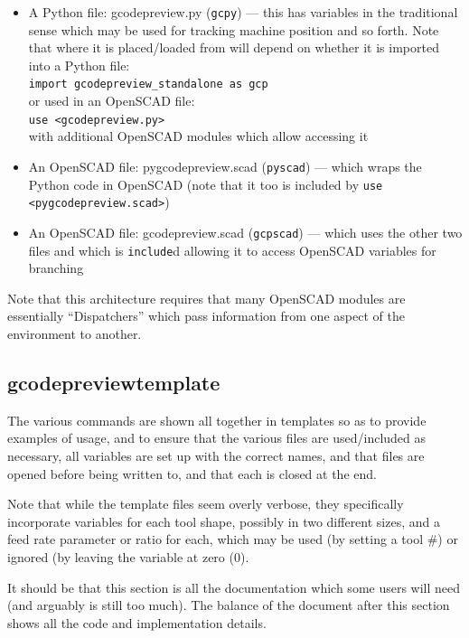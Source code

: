 \documentclass{ltxdoc}
\begin{document}
\begin{itemize}
\item A Python file: gcodepreview.py (\texttt{gcpy}) --- this has variables in the 
      traditional sense which may be used for tracking machine position and so forth. 
      Note that where it is placed/loaded from will depend on whether it is imported into
      a Python file:\\
      \verb|import gcodepreview_standalone as gcp|\\ 
      or used in an OpenSCAD file:\\
      \verb|use <gcodepreview.py>|\\
      with additional OpenSCAD modules which allow accessing it
\item An OpenSCAD file: pygcodepreview.scad (\texttt{pyscad}) --- which wraps the Python code 
      in OpenSCAD (note that it too is included by \verb|use <pygcodepreview.scad>|)
\item An OpenSCAD file: gcodepreview.scad (\texttt{gcpscad}) --- which uses the other two files 
      and which is \texttt{include}d allowing it to access OpenSCAD variables for branching   
\end{itemize}

\noindent Note that this architecture requires that many OpenSCAD modules are essentially 
``Dispatchers'' which pass information from one aspect of the environment to another.

\subsection{gcodepreviewtemplate}

The various commands are shown all together in templates so as to provide examples of usage, and to ensure that the various files are used/included as necessary, all variables are set up with the correct names, and that files are opened before being written to, and that each is closed at the end. 

Note that while the template files seem overly verbose, they specifically incorporate variables for each tool shape, possibly in two different sizes, and a feed rate parameter or ratio for each, which may be used (by setting a tool \#) or ignored (by leaving the variable at zero (0).

It should be that this section is all the documentation which some users will need (and arguably is still too much). The balance of the document after this section shows all the code and implementation details.
\end{document}
